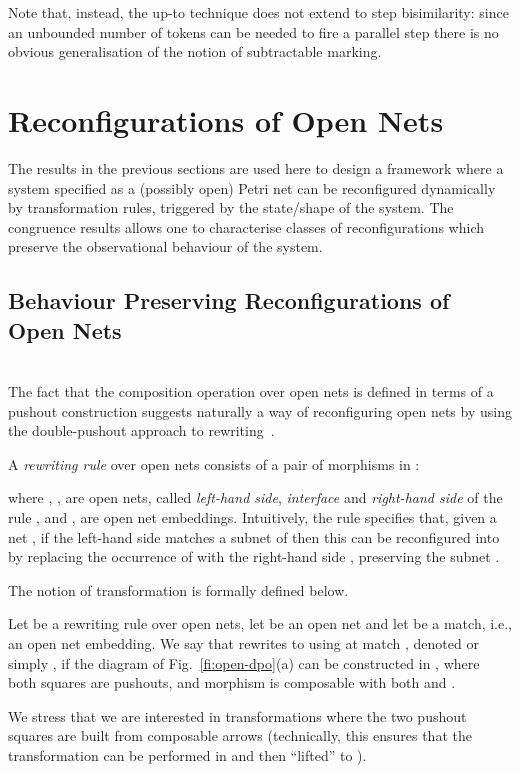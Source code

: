 \documentclass{LMCS}
\begin{document}
\smallskip


Note that, instead, the up-to technique does not extend to step
bisimilarity: since an unbounded number of tokens can be needed to
fire a parallel step there is no obvious generalisation of the notion of subtractable marking.


\section{Reconfigurations of Open Nets}


The results in the previous sections are used here to design a
framework where a system specified as a (possibly open) Petri net can
be reconfigured dynamically by transformation rules, triggered by the
state/shape of the system. The congruence results allows one to
characterise classes of reconfigurations which preserve the
observational behaviour of the system. 

\subsection{Behaviour Preserving Reconfigurations of  Open Nets}
\ \\

\noindent
The fact that the composition operation over open nets is defined in terms of a
pushout construction suggests naturally a way of reconfiguring open nets by
using the double-pushout approach to rewriting~\cite{Ehr:TIAA}.

A \emph{rewriting rule} over open nets consists of a pair of morphisms
in :
\begin{center}
  
\end{center}
where , ,  are open nets, called \emph{left-hand side},
\emph{interface} and \emph{right-hand side} of the rule , and , 
are open net embeddings.
Intuitively, the rule specifies that, given a net
, if the left-hand side  matches a subnet of  then this can be
reconfigured into  by replacing the occurrence of  with the
right-hand side , preserving the subnet
.

The notion of transformation is formally defined below.

\begin{defi}
\label{de:transformation}
  Let  be a rewriting rule over open nets, let  be an open net and let
   be a match, i.e., an open net embedding. We say that 
  rewrites to  using  at match , denoted  or simply
  , if the diagram of Fig.~\ref{fi:open-dpo}(a) can be
  constructed in ,
where both squares are pushouts, and morphism  is 
  composable with both  and .
\end{defi}
We stress that we are interested in transformations where the two pushout
squares are built from composable arrows (technically, this ensures that the
transformation can be performed in  and then ``lifted'' to ).
\end{document}
